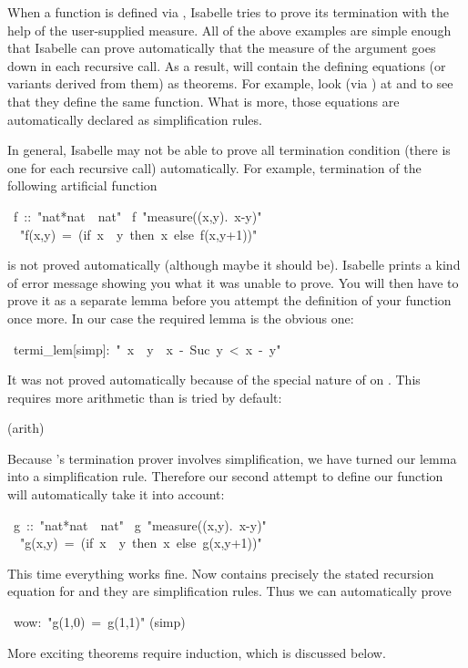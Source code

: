 \begin{isabelle}%
%
\begin{isamarkuptext}%
When a function is defined via , Isabelle tries to prove
its termination with the help of the user-supplied measure.  All of the above
examples are simple enough that Isabelle can prove automatically that the
measure of the argument goes down in each recursive call. As a result,
 will contain the defining equations (or variants derived from
them) as theorems. For example, look (via ) at
 and  to see that they define the same
function. What is more, those equations are automatically declared as
simplification rules.

In general, Isabelle may not be able to prove all termination condition
(there is one for each recursive call) automatically. For example,
termination of the following artificial function%
\end{isamarkuptext}%
~f~::~{"}nat*nat~{\isasymRightarrow}~nat{"}\isanewline
{}~f~{"}measure({\isasymlambda}(x,y).~x-y){"}\isanewline
~~{"}f(x,y)~=~(if~x~{\isasymle}~y~then~x~else~f(x,y+1)){"}%
\begin{isamarkuptext}%
\noindent
is not proved automatically (although maybe it should be). Isabelle prints a
kind of error message showing you what it was unable to prove. You will then
have to prove it as a separate lemma before you attempt the definition
of your function once more. In our case the required lemma is the obvious one:%
\end{isamarkuptext}%
~termi\_lem[simp]:~{"}{\isasymnot}~x~{\isasymle}~y~{\isasymLongrightarrow}~x~-~Suc~y~<~x~-~y{"}%
\begin{isamarkuptxt}%
\noindent
It was not proved automatically because of the special nature of \isa{-}
on . This requires more arithmetic than is tried by default:%
\end{isamarkuptxt}%
(arith)%
\begin{isamarkuptext}%
\noindent
Because 's termination prover involves simplification,
we have turned our lemma into a simplification rule. Therefore our second
attempt to define our function will automatically take it into account:%
\end{isamarkuptext}%
~g~::~{"}nat*nat~{\isasymRightarrow}~nat{"}\isanewline
{}~g~{"}measure({\isasymlambda}(x,y).~x-y){"}\isanewline
~~{"}g(x,y)~=~(if~x~{\isasymle}~y~then~x~else~g(x,y+1)){"}%
\begin{isamarkuptext}%
\noindent
This time everything works fine. Now  contains precisely the
stated recursion equation for  and they are simplification
rules. Thus we can automatically prove%
\end{isamarkuptext}%
~wow:~{"}g(1,0)~=~g(1,1){"}\isanewline
{}(simp)%
\begin{isamarkuptext}%
\noindent
More exciting theorems require induction, which is discussed below.


\end{isamarkuptext}
\end{isabelle}
